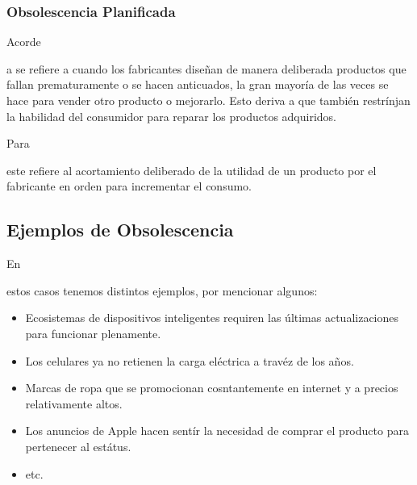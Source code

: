 \documentclass[stu, 12pt, letterpaper, donotrepeattitle, floatsintext, natbib]{apa7}
\begin{document}
\subsubsection{Obsolescencia Planificada}
Acorde \begin{justifying}
  a \cite{consumers-international-no-date}%
  se refiere a cuando los fabricantes diseñan de manera deliberada productos que fallan prematuramente o se hacen anticuados, la gran mayoría de las veces
  se hace para vender otro producto o mejorarlo. Esto deriva a que también restrínjan la habilidad del consumidor para reparar los productos adquiridos.\par
\end{justifying}
Para \begin{justifying}
  \cite{unknown-author-no-dateB}%
  este refiere al acortamiento deliberado de la utilidad de un producto por el fabricante en orden para incrementar el consumo.\par
\end{justifying}
\vspace{\baselineskip}
\subsection{Ejemplos de Obsolescencia}
En \begin{justifying}
  estos casos tenemos distintos ejemplos, por mencionar algunos:
  \begin{itemize}
    \item Ecosistemas de dispositivos inteligentes requiren las últimas actualizaciones para funcionar plenamente.
    \item Los celulares ya no retienen la carga eléctrica a travéz de los años.
    \item Marcas de ropa que se promocionan cosntantemente en internet y a precios relativamente altos.
    \item Los anuncios de Apple hacen sentír la necesidad de comprar el producto para pertenecer al estátus.
    \item etc.
  \end{itemize}\par
\end{justifying}
\vspace{\baselineskip}
\end{document}
